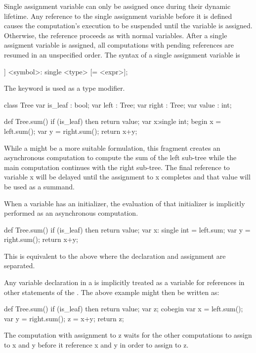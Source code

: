 Single assignment variable can only be assigned once during their
dynamic lifetime.  Any reference to the single assignment variable
before it is defined causes the computation's execution to be
suspended until the variable is assigned. Otherwise, the reference
proceeds as with normal variables.  After a single assigment variable is
assigned, all computations with pending references are resumed in an
unspecified order. The syntax of a single assignment variable is
\begin{chapel}
[[var]] <symbol>: single <type> [= <expr>];
\end{chapel}
The keyword  is used as a type modifier. 

\begin{example}
\begin{chapel}
class Tree {
  var is_leaf : bool;
  var left    : Tree;
  var right   : Tree;
  var value   : int;
}

def Tree.sum() {
  if (is_leaf) then return value;
  var x:single int;
  begin x = left.sum();
  var y = right.sum();
  return x+y;
}
\end{chapel}
While a  might be a more suitable formulation, this
fragment creates an asynchronous computation to compute the sum of the
left sub-tree while the main computation continues with the right
sub-tree. The final reference to variable x will be delayed until the
assignment to x completes and that value will be used as a summand.
\end{example}

When a  variable has an initializer, the evaluation of
that initializer is implicitly performed as an asynchronous
computation. 
\begin{example}
\begin{chapel}
def Tree.sum() {
  if (is_leaf) then return value;
  var x: single int = left.sum;
  var y = right.sum();
  return x+y;
}
\end{chapel}
This is equivalent to the above where the declaration and assignment are
separated.
\end{example}

Any variable declaration in a  is implicitly treated as
a  variable for references in other statements of the
.  The above example might then be written as:
\begin{example}
\begin{chapel}
def Tree.sum() {
  if (is_leaf) then return value;
  var z;
  cobegin {
    var x = left.sum();
    var y = right.sum();
    z = x+y;
  }
  return z;
}
\end{chapel}
The computation with assignment to z waits for the other computations 
to assign to x and y before it reference x and y in order to assign to z.
\end{example}
